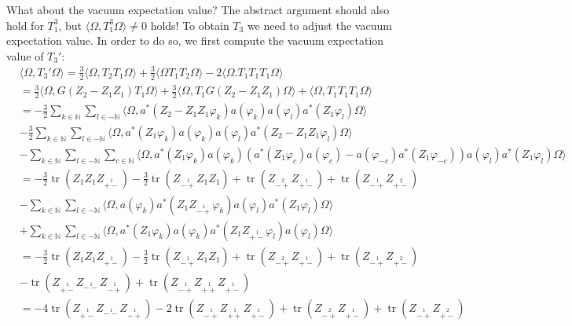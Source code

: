 \documentclass[oneside,reqno,12pt]{amsart}
\DeclareMathOperator{\tr}{tr}
\begin{document}
 What about the vacuum expectation value? The abstract argument should also hold for \(T_1^3\), but \(\langle \Omega, T_1^3 \Omega\rangle\neq 0\) holds! To obtain \(T_3\) we need to adjust the vacuum expectation value. In order to do so, we first compute the vacuum expectation value of \(T_3'\):
 \begin{align*}
 &\langle \Omega, T_3' \Omega\rangle= \frac{3}{2} \langle \Omega, T_2T_1 \Omega \rangle + \frac{3}{2} \langle \Omega T_1 T_2 \Omega \rangle - 2 \langle \Omega. T_1 T_1 T_1 \Omega \rangle\\
 &=\frac{3}{2} \langle \Omega, G\left( Z_2-Z_1Z_1\right)T_1\Omega \rangle +\frac{3}{2} \langle \Omega, T_1 G \left( Z_2-Z_1Z_1\right) \Omega \rangle + \langle \Omega, T_1 T_1 T_1 \Omega \rangle\\
 &=- \frac{3}{2} \sum_{k\in \mathbb{N}} \sum_{l\in -\mathbb{N}} \langle \Omega, a^*\left( Z_2-Z_1Z_1 \varphi_k\right)a(\varphi_k)a(\varphi_l) a^*\left(Z_1\varphi_l\right) \Omega \rangle \\
 &-\frac{3}{2} \sum_{k\in \mathbb{N}} \sum_{l\in -\mathbb{N}} \langle \Omega, a^*\left( Z_1 \varphi_k\right)a(\varphi_k)a(\varphi_l) a^*\left(Z_2-Z_1Z_1\varphi_l\right) \Omega \rangle \\
 &- \sum_{k\in\mathbb{N}}\sum_{l\in-\mathbb{N}} \sum_{c\in\mathbb{N}} \langle \Omega, a^*\left( Z_1 \varphi_k\right) a(\varphi_k) \left( a^*\left( Z_1 \varphi_c\right) a(\varphi_c) - a(\varphi_{-c}) a^*\left( Z_1 \varphi_{-c}\right) \right) a(\varphi_l) a^*\left( Z_1 \varphi_l\right) \Omega \rangle \\
 &= -\frac{3}{2} \tr \left(Z_1Z_1 Z_{\stackrel{1}{+-}} \right)
 -\frac{3}{2} \tr \left( Z_{\stackrel{1}{-+}}Z_1 Z_1 \right) 
 + \tr \left( Z_{\stackrel{2}{-+}} Z_{\stackrel{1}{+-}}\right) 
 +\tr \left(  Z_{\stackrel{1}{-+}}Z_{\stackrel{2}{+-}}\right) \\
  &- \sum_{k\in\mathbb{N}}\sum_{l\in-\mathbb{N}} \langle \Omega,  a(\varphi_k) a^*\left( Z_1 Z_{\stackrel{1}{-+}}\varphi_{k}\right) a(\varphi_l) a^*\left( Z_1 \varphi_l\right) \Omega \rangle \\
   &+ \sum_{k\in\mathbb{N}}\sum_{l\in-\mathbb{N}} \langle \Omega, a^*\left( Z_1 \varphi_k\right) a(\varphi_k) a^*\left( Z_1 Z_{\stackrel{1}{+-}} \varphi_l\right)   a(\varphi_l) \Omega \rangle \\
&= -\frac{3}{2} \tr \left(Z_1Z_1 Z_{\stackrel{1}{+-}} \right)
 -\frac{3}{2} \tr \left( Z_{\stackrel{1}{-+}}Z_1 Z_1 \right) 
 + \tr \left( Z_{\stackrel{2}{-+}} Z_{\stackrel{1}{+-}}\right) 
 +\tr \left(  Z_{\stackrel{1}{-+}}Z_{\stackrel{2}{+-}}\right) \\
&- \tr\left( Z_{\stackrel{1}{+-}} Z_{\stackrel{1}{--}} Z_{\stackrel{1}{-+}}\right)  
+ \tr\left(Z_{\stackrel{1}{-+}} Z_{\stackrel{1}{++}} Z_{\stackrel{1}{+-}}  \right)  \\
&=-4 \tr\left( Z_{\stackrel{1}{+-}} Z_{\stackrel{1}{--}} Z_{\stackrel{1}{-+}}\right)  
-2 \tr\left(Z_{\stackrel{1}{-+}} Z_{\stackrel{1}{++}} Z_{\stackrel{1}{+-}}  \right)  
 + \tr \left( Z_{\stackrel{2}{-+}} Z_{\stackrel{1}{+-}}\right) 
 +\tr \left(  Z_{\stackrel{1}{-+}}Z_{\stackrel{2}{+-}}\right) \\
 \end{align*}
 
\end{document}
